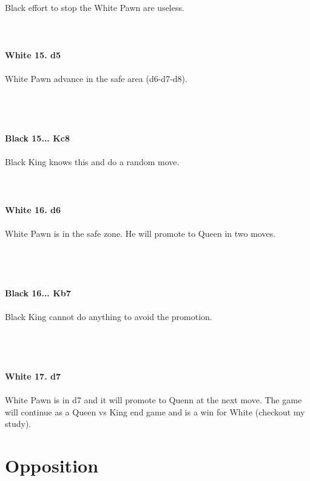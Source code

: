 \documentclass{article}
\begin{document}
\\
Black effort to stop the White Pawn are useless.\\
\\

\\
\\
\textbf{White 15. d5}\\
\\
White Pawn advance in the safe area (d6-d7-d8).\\\\
\\

\\
\\
\textbf{Black 15... Kc8}\\
\\
Black King knows this and do a random move.\\
\\

\\
\\
\textbf{White 16. d6}\\
\\
White Pawn is in the safe zone. He will promote to Queen in two moves.\\\\
\\

\\
\\
\textbf{Black 16... Kb7}\\
\\
Black King cannot do anything to avoid the promotion.\\\\
\\

\\
\\
\textbf{White 17. d7}\\
\\
White Pawn is in d7 and it will promote to Quenn at the next move. The game will continue as a Queen vs King end game and is a win for White (checkout my study).\\\section{ Opposition}
\end{document}
